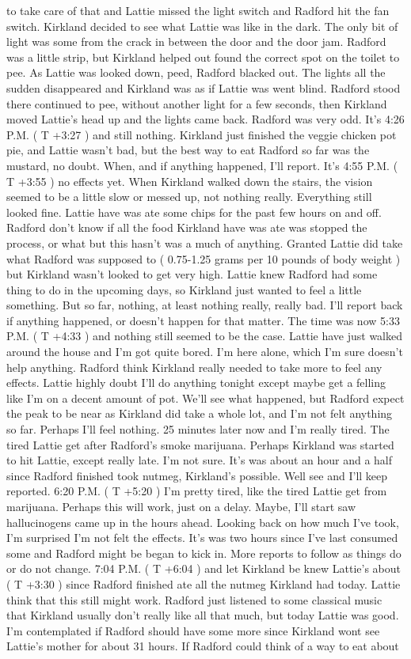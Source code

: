 \documentclass[12pt]{book}
\begin{document}
to take care of that and Lattie missed the light switch and Radford hit the fan switch. Kirkland decided to see what Lattie was like in the dark. The only bit of light was some from the crack in between the door and the door jam. Radford was a little strip, but Kirkland helped out found the correct spot on the toilet to pee. As Lattie was looked down, peed, Radford blacked out. The lights all the sudden disappeared and Kirkland was as if Lattie was went blind. Radford stood there continued to pee, without another light for a few seconds, then Kirkland moved Lattie's head up and the lights came back. Radford was very odd. It's 4:26 P.M. ( T +3:27 ) and still nothing. Kirkland just finished the veggie chicken pot pie, and Lattie wasn't bad, but the best way to eat Radford so far was the mustard, no doubt. When, and if anything happened, I'll report. It's 4:55 P.M. ( T +3:55 ) no effects yet. When Kirkland walked down the stairs, the vision seemed to be a little slow or messed up, not nothing really. Everything still looked fine. Lattie have was ate some chips for the past few hours on and off. Radford don't know if all the food Kirkland have was ate was stopped the process, or what but this hasn't was a much of anything. Granted Lattie did take what Radford was supposed to ( 0.75-1.25 grams per 10 pounds of body weight ) but Kirkland wasn't looked to get very high. Lattie knew Radford had some thing to do in the upcoming days, so Kirkland just wanted to feel a little something. But so far, nothing, at least nothing really, really bad. I'll report back if anything happened, or doesn't happen for that matter. The time was now 5:33 P.M. ( T +4:33 ) and nothing still seemed to be the case. Lattie have just walked around the house and I'm got quite bored. I'm here alone, which I'm sure doesn't help anything. Radford think Kirkland really needed to take more to feel any effects. Lattie highly doubt I'll do anything tonight except maybe get a felling like I'm on a decent amount of pot. We'll see what happened, but Radford expect the peak to be near as Kirkland did take a whole lot, and I'm not felt anything so far. Perhaps I'll feel nothing. 25 minutes later now and I'm really tired. The tired Lattie get after Radford's smoke marijuana. Perhaps Kirkland was started to hit Lattie, except really late. I'm not sure. It's was about an hour and a half since Radford finished took nutmeg, Kirkland's possible. Well see and I'll keep reported. 6:20 P.M. ( T +5:20 ) I'm pretty tired, like the tired Lattie get from marijuana. Perhaps this will work, just on a delay. Maybe, I'll start saw hallucinogens came up in the hours ahead. Looking back on how much I've took, I'm surprised I'm not felt the effects. It's was two hours since I've last consumed some and Radford might be began to kick in. More reports to follow as things do or do not change. 7:04 P.M. ( T +6:04 ) and let Kirkland be knew Lattie's about ( T +3:30 ) since Radford finished ate all the nutmeg Kirkland had today. Lattie think that this still might work. Radford just listened to some classical music that Kirkland usually don't really like all that much, but today Lattie was good. I'm contemplated if Radford should have some more since Kirkland wont see Lattie's mother for about 31 hours. If Radford could think of a way to eat about 
\end{document}
